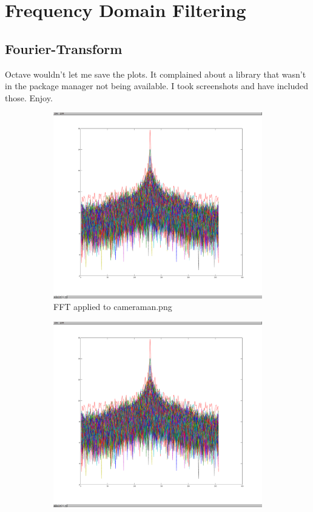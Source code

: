 \section{Frequency Domain Filtering}
\subsection{Fourier-Transform}
Octave wouldn't let me save the plots. It complained about a library that wasn't in the package manager not being available.
I took screenshots and have included those. Enjoy.

\begin{figure}[H]
    \begin{subfigure}{0.5\textwidth}
        \includegraphics[width=\textwidth]{../code/3_out/cameraman.png}
        \caption{FFT applied to cameraman.png}
    \end{subfigure}
    \begin{subfigure}{0.5\textwidth}
        \includegraphics[width=\textwidth]{../code/3_out/bricks.png}

\end{subfigure}
\end{figure}
